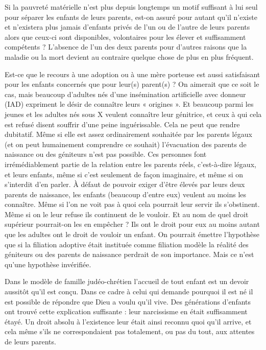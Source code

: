  Si la pauvreté matérielle n'est plus depuis longtemps un motif suffisant à lui seul pour séparer les enfants de leurs parents, est-on assuré pour autant qu'il n'existe et n'existera plus jamais d'enfants privés de l'un ou de l'autre de leurs parents alors que ceux-ci sont disponibles, volontaires pour les élever et suffisamment compétents ? L'absence de l'un des deux parents pour d'autres raisons que la maladie ou la mort devient au contraire quelque chose de plus en plus fréquent. 

 Est-ce que le recours à une adoption ou à une mère porteuse est aussi satisfaisant pour les enfants concernés que pour leur(s) parent(s) ? On aimerait que ce soit le cas, mais beaucoup d'adultes nés d'une insémination artificielle avec donneur (IAD) expriment le désir de connaître leurs « origines ». Et beaucoup parmi les jeunes et les adultes nés sous X veulent connaître leur génitrice, et ceux à qui cela est refusé disent souffrir d'une peine inguérissable. Cela ne peut que rendre dubitatif. Même si elle est assez ordinairement souhaitée par les parents légaux (et on peut humainement comprendre ce souhait) l'évacuation des parents de naissance ou des géniteurs n'est pas possible. Ces personnes font irrémédiablement partie de la relation entre les parents réels, c'est-à-dire légaux, et leurs enfants, même si c'est seulement de façon imaginaire, et même si on s'interdit d'en parler. À défaut de pouvoir exiger d'être élevés par leurs deux parents de naissance, les enfants (beaucoup d'entre eux) veulent au moins les connaître.  Même si l'on ne voit pas à quoi cela pourrait leur servir ils s'obstinent. Même si on le leur refuse ils continuent de le vouloir. Et au nom de quel droit supérieur pourrait-on les en empêcher ? Ils ont le droit pour eux au moins autant que les adultes ont le droit de vouloir un enfant. On pourrait émettre l'hypothèse que si la filiation adoptive était instituée comme filiation modèle la réalité des géniteurs ou des parents de naissance perdrait de son importance. Mais ce n'est qu'une hypothèse invérifiée.

 Dans le modèle de famille judéo-chrétien  l'accueil de tout enfant est un devoir aussitôt qu'il est conçu. Dans ce cadre à celui qui demande pourquoi il est né il est possible de répondre que Dieu a voulu qu'il vive. Des générations d'enfants ont trouvé cette explication suffisante : leur narcissisme en était suffisamment étayé. Un droit absolu à l'existence leur était ainsi reconnu quoi qu'il arrive, et cela même s'ils ne correspondaient pas totalement, ou pas du tout, aux attentes de leurs parents.
  
